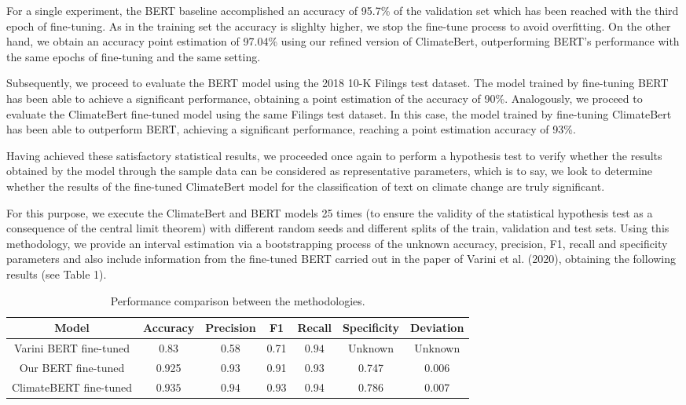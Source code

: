 \documentclass[runningheads]{llncs}
\begin{document}
For a single experiment, the BERT baseline  accomplished an accuracy of 95.7\% of the validation set which has been reached with the third epoch of fine-tuning. As in the training set the accuracy is slighlty higher, we stop the fine-tune process to avoid overfitting. On the other hand, we obtain an accuracy point estimation of 97.04\% using our refined version of ClimateBert, outperforming BERT’s performance with the same epochs of fine-tuning and the same setting. 

Subsequently, we proceed to evaluate the BERT model using the 2018 10-K Filings test dataset. The model trained by fine-tuning BERT has been able to achieve a significant performance, obtaining a point estimation of the accuracy of 90\%. Analogously, we proceed to evaluate the ClimateBert fine-tuned model using the same Filings test dataset. In this case, the model trained by fine-tuning ClimateBert has been able to outperform BERT, achieving a significant performance, reaching a  point estimation accuracy of 93\%. 

Having achieved these satisfactory statistical results, we proceeded once again to perform a hypothesis test to verify whether the results obtained by the model through the sample data can be considered as representative parameters, which is to say, we look to determine whether the results of the fine-tuned ClimateBert model for the classification of text on climate change are truly significant. 

For this purpose, we execute the ClimateBert and BERT models 25 times (to ensure the validity of the statistical hypothesis test as a consequence of the central limit theorem) with different random seeds and different splits of the train, validation and test sets. Using this methodology, we provide an interval estimation via a bootstrapping process of the unknown accuracy, precision, F1, recall and specificity parameters and also include information from the fine-tuned BERT carried out in the paper of Varini et al. (2020), obtaining the following results (see Table 1). 

\begin{table}
\begin{center}
\begin{tabular}{||c | c | c | c | c | c | c||} 
 \hline
 Model & Accuracy & Precision & F1 & Recall & Specificity & Deviation \\ [0.5ex] 
 \hline\hline
 Varini BERT fine-tuned & 0.83 & 0.58 & 0.71 & $\mathbf{0.94}$ & Unknown & Unknown \\ 
 \hline
 Our BERT fine-tuned & 0.925 & 0.93 & 0.91 & 0.93 & 0.747 & 0.006 \\
 \hline
 ClimateBERT fine-tuned & $\mathbf{0.935}$ & $\mathbf{0.94}$ & $\mathbf{0.93}$ & 0.94 & $\mathbf{0.786}$ & 0.007 \\
 [1ex] 
 \hline
\end{tabular}
\caption{Performance comparison between the methodologies.}
\end{center}
\end{table}
\end{document}
